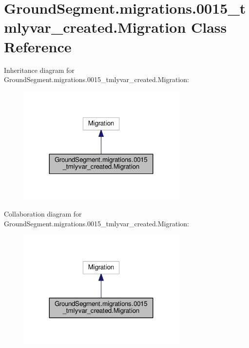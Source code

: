 \hypertarget{class_ground_segment_1_1migrations_1_10015__tmlyvar__created_1_1_migration}{}\section{Ground\+Segment.\+migrations.0015\+\_\+tmlyvar\+\_\+created.Migration Class Reference}
\label{class_ground_segment_1_1migrations_1_10015__tmlyvar__created_1_1_migration}


Inheritance diagram for Ground\+Segment.\+migrations.0015\+\_\+tmlyvar\+\_\+created.Migration\+:\nopagebreak
\begin{figure}[H]
\begin{center}
\leavevmode
\includegraphics[width=239pt]{class_ground_segment_1_1migrations_1_10015__tmlyvar__created_1_1_migration__inherit__graph}
\end{center}
\end{figure}


Collaboration diagram for Ground\+Segment.\+migrations.0015\+\_\+tmlyvar\+\_\+created.Migration\+:\nopagebreak
\begin{figure}[H]
\begin{center}
\leavevmode
\includegraphics[width=239pt]{class_ground_segment_1_1migrations_1_10015__tmlyvar__created_1_1_migration__coll__graph}
\end{center}
\end{figure}
